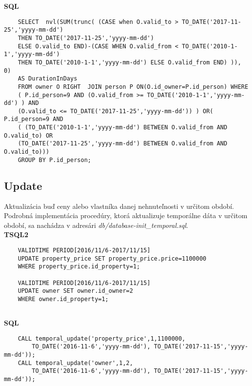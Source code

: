 \documentclass[11pt, a4paper]{article}
\begin{document}
\textbf{SQL}
\begin{center}
\begin{verbatim}
    SELECT  nvl(SUM(trunc( (CASE when O.valid_to > TO_DATE('2017-11-25','yyyy-mm-dd')
    THEN TO_DATE('2017-11-25','yyyy-mm-dd')
    ELSE O.valid_to END)-(CASE WHEN O.valid_from < TO_DATE('2010-1-1','yyyy-mm-dd') 
    THEN TO_DATE('2010-1-1','yyyy-mm-dd') ELSE O.valid_from END) )), 0) 
    AS DurationInDays 
    FROM owner O RIGHT  JOIN person P ON(O.id_owner=P.id_person) WHERE
    ( P.id_person=9 AND (O.valid_from >= TO_DATE('2010-1-1','yyyy-mm-dd') ) AND 
    (O.valid_to <= TO_DATE('2017-11-25','yyyy-mm-dd')) ) OR( P.id_person=9 AND 
    ( (TO_DATE('2010-1-1','yyyy-mm-dd') BETWEEN O.valid_from AND O.valid_to) OR
    (TO_DATE('2017-11-25','yyyy-mm-dd') BETWEEN O.valid_from AND O.valid_to)))
    GROUP BY P.id_person;
\end{verbatim}
\end{center}

\subsection{Update}
Aktualizácia buď ceny alebo vlastníka danej nehnuteľnosti v určitom období. Podrobná implementácia procedúry, ktorá aktualizuje temporálne dáta v určitom období, sa nachádza v adresári \textit{db/database-init\_temporal.sql}.\\

\textbf{TSQL2}

\begin{center}
\begin{verbatim}
    VALIDTIME PERIOD[2016/11/6-2017/11/15]
    UPDATE property_price SET property_price.price=1100000
    WHERE property_price.id_property=1;
    
    VALIDTIME PERIOD[2016/11/6-2017/11/15]
    UPDATE owner SET owner.id_owner=2
    WHERE owner.id_property=1;
    
\end{verbatim}
\end{center}

\textbf{SQL}
\begin{center}
\begin{verbatim}
    CALL temporal_update('property_price',1,1100000,
        TO_DATE('2016-11-6','yyyy-mm-dd'), TO_DATE('2017-11-15','yyyy-mm-dd'));
    CALL temporal_update('owner',1,2,
        TO_DATE('2016-11-6','yyyy-mm-dd'), TO_DATE('2017-11-15','yyyy-mm-dd'));
\end{verbatim}
\end{center}
\end{document}
